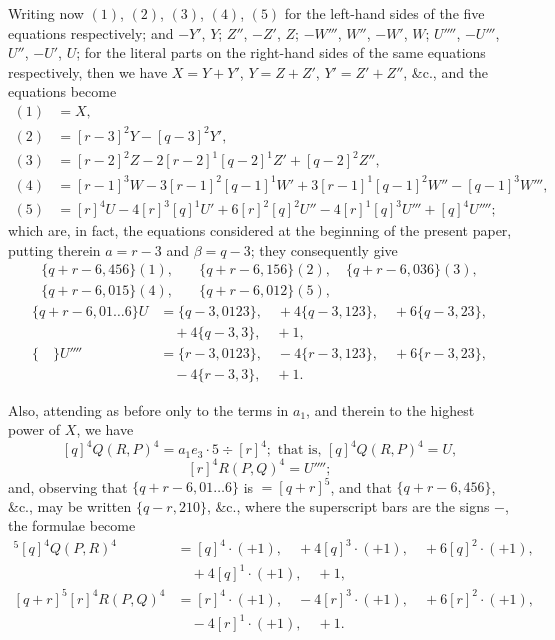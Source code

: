 \documentclass[11pt,a4paper]{book}
\begin{document}
Writing now $(1)$, $(2)$, $(3)$, $(4)$, $(5)$ for the left-hand sides of the five equations respectively; and $-Y'$, $Y$; $Z''$, $-Z'$, $Z$; $-W'''$, $W''$, $-W'$, $W$; $U''''$, $-U'''$, $U''$, $-U'$, $U$; for the literal parts on the right-hand sides of the same equations respectively, then we have $X = Y + Y'$, $Y = Z + Z'$, $Y' = Z' + Z''$, \&c., and the equations become
\begin{align*}
(1) &= X, \\
(2) &= [r-3]^2 Y - [q-3]^2 Y', \\
(3) &= [r-2]^2 Z - 2[r-2]^1[q-2]^1 Z' + [q-2]^2 Z'', \\
(4) &= [r-1]^3 W - 3[r-1]^2[q-1]^1 W' + 3[r-1]^1[q-1]^2 W'' - [q-1]^3 W''', \\
(5) &= [r]^4 U - 4[r]^3[q]^1 U' + 6[r]^2[q]^2 U'' - 4[r]^1[q]^3 U''' + [q]^4 U'''';
\end{align*}
which are, in fact, the equations considered at the beginning of the present paper, putting therein $a = r-3$ and $\beta = q-3$; they consequently give
\begin{align*}
\{q + r - 6, 456\}(1), \quad &\{q + r - 6, 156\}(2), \quad \{q + r - 6, 036\}(3), \\
\{q + r - 6, 015\}(4), \quad &\{q + r - 6, 012\}(5),
\end{align*}
\begin{align*}
\{q + r - 6, 01 \ldots 6\}U &= \{q - 3, 0123\}, \quad +4\{q - 3, 123\}, \quad +6\{q - 3, 23\}, \\
&\quad +4\{q - 3, 3\}, \quad +1, \\
\{ \quad \}U'''' &= \{r - 3, 0123\}, \quad -4\{r - 3, 123\}, \quad +6\{r - 3, 23\}, \\
&\quad -4\{r - 3, 3\}, \quad +1.
\end{align*}

Also, attending as before only to the terms in $a_1$, and therein to the highest power of $X$, we have
\[
[q]^4 Q(R, P)^4 = a_1 e_3 \cdot 5 \div [r]^4; \text{ that is, } [q]^4 Q(R, P)^4 = U,
\]
\[
[r]^4 R(P, Q)^4 = U'''';
\]
and, observing that $\{q + r - 6, 01 \ldots 6\}$ is $= [q + r]^5$, and that $\{q + r - 6, 456\}$, \&c., may be written $\{q - r, 210\}$, \&c., where the superscript bars are the signs $-$, the formulae become
\begin{align*}
[q + r]^5 [q]^4 Q(P, R)^4 &= [q]^4 \cdot (+1), \quad +4[q]^3 \cdot (+1), \quad +6[q]^2 \cdot (+1), \\
&\quad +4[q]^1 \cdot (+1), \quad +1, \\
[q + r]^5 [r]^4 R(P, Q)^4 &= [r]^4 \cdot (+1), \quad -4[r]^3 \cdot (+1), \quad +6[r]^2 \cdot (+1), \\
&\quad -4[r]^1 \cdot (+1), \quad +1.
\end{align*}
\end{document}
